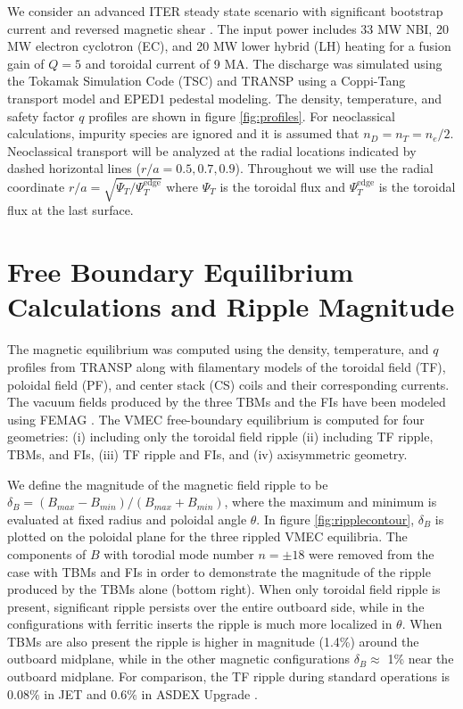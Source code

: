 \documentclass{article}
\begin{document}
We consider an advanced ITER steady state scenario with significant bootstrap current and reversed magnetic shear \cite{Poli2014}. The input power includes 33 MW NBI, 20 MW electron cyclotron (EC), and 20 MW lower hybrid (LH) heating for a fusion gain of $Q = 5$ and toroidal current of 9 MA. The discharge was simulated using the Tokamak Simulation Code (TSC) \cite{Jardin1986} and TRANSP \cite{Hawryluk1980} using a Coppi-Tang \cite{Jardin1993} transport model and EPED1 \cite{Snyder2011} pedestal modeling. The density, temperature, and safety factor $q$ profiles are shown in figure \ref{fig:profiles}. For neoclassical calculations, impurity species are ignored and it is assumed that $n_D = n_T = n_e/2$. Neoclassical transport will be analyzed at the radial locations indicated by dashed horizontal lines ($r/a = 0.5, 0.7, 0.9$). Throughout we will use the radial coordinate $r/a = \sqrt{\Psi_T/\Psi_T^{\text{edge}}}$ where $\Psi_T$ is the toroidal flux and $\Psi_T^{\text{edge}}$ is the toroidal flux at the last surface.

\FloatBarrier

\section{Free Boundary Equilibrium Calculations and Ripple Magnitude} \label{vmec}

The magnetic equilibrium was computed using the density, temperature, and $q$ profiles from TRANSP along with filamentary models of the toroidal field (TF), poloidal field (PF), and center stack (CS) coils and their corresponding currents. The vacuum fields produced by the three TBMs and the FIs have been modeled using FEMAG \cite{Shinohara2009}. The VMEC free-boundary equilibrium \cite{Hirshman1986} is computed for four geometries: (i) including only the toroidal field ripple (ii) including TF ripple, TBMs, and FIs, (iii) TF ripple and FIs, and (iv) axisymmetric geometry.  

We define the magnitude of the magnetic field ripple to be $\delta_B = (B_{max}-B_{min})/(B_{max} + B_{min})$, where the maximum and minimum is evaluated at fixed radius and poloidal angle $\theta$. In figure \ref{fig:ripplecontour}, $\delta_B$ is plotted on the poloidal plane for the three rippled VMEC equilibria. The components of $B$ with torodial mode number $n = \pm 18$ were removed from the case with TBMs and FIs in order to demonstrate the magnitude of the ripple produced by the TBMs alone (bottom right). When only toroidal field ripple is present, significant ripple persists over the entire outboard side, while in the configurations with ferritic inserts the ripple is much more localized in $\theta$. When TBMs are also present the ripple is higher in magnitude (1.4\%) around the outboard midplane, while in the other magnetic configurations $\delta_B \approx$ 1\% near the outboard midplane. For comparison, the TF ripple during standard operations is $0.08\%$ in JET \cite{DeVries2008} and $0.6\%$ in ASDEX Upgrade \cite{Martitsch2016}. 
\end{document}
